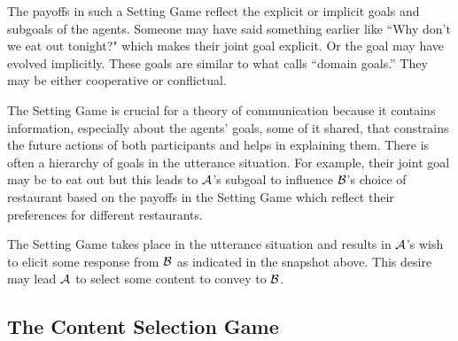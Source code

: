 The payoffs in such a Setting Game reflect the explicit or implicit goals and subgoals of the agents. Someone may have said something earlier like ``Why don't we eat out tonight?" which makes their joint goal explicit. Or the goal may have evolved  implicitly. These goals are similar to what \citet{roberts:is} calls ``domain goals.'' They may be either cooperative or conflictual.

The Setting Game is crucial for a theory of communication because it contains information, especially about the agents' goals, some of it shared, that constrains the future actions of both participants and helps in explaining them. There is often a hierarchy of goals in the utterance situation. For example, their joint goal may be to eat out but this leads to $\cal A$'s subgoal to influence $\cal B$'s choice of restaurant based on the payoffs in the Setting Game which reflect their preferences for different restaurants. 


The Setting Game takes place in the utterance situation and results in $\cal A$'s wish to elicit some response from $\cal B$ as indicated in the snapshot above. This desire may lead $\cal A$ to select some content to convey to $\cal B$.


\subsection{The Content Selection Game}

